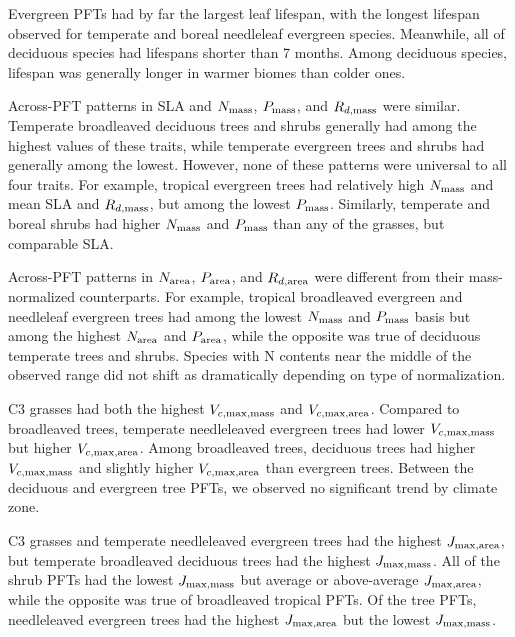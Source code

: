 Evergreen PFTs had by far the largest leaf lifespan, with the longest lifespan observed for temperate and boreal needleleaf evergreen species.
Meanwhile, all of deciduous species had lifespans shorter than 7 months.
Among deciduous species, lifespan was generally longer in warmer biomes than colder ones.

Across-PFT patterns in SLA and $N_{\text{mass}}$, $P_{\text{mass}}$, and $R_{d,\text{mass}}$ were similar.
Temperate broadleaved deciduous trees and shrubs generally had among the highest values of these traits, while temperate evergreen trees and shrubs had generally among the lowest.
However, none of these patterns were universal to all four traits.
For example, tropical evergreen trees had relatively high $N_{\text{mass}}$ and mean SLA and $R_{d,\text{mass}}$, but among the lowest $P_{\text{mass}}$.
Similarly, temperate and boreal shrubs had higher $N_{\text{mass}}$ and $P_{\text{mass}}$ than any of the grasses, but comparable SLA\@.

Across-PFT patterns in $N_{\text{area}}$, $P_{\text{area}}$, and $R_{d,\text{area}}$ were different from their mass-normalized counterparts.
For example, tropical broadleaved evergreen and needleleaf evergreen trees had among the lowest $N_{\text{mass}}$ and $P_{\text{mass}}$ basis but among the highest $N_{\text{area}}$ and $P_{\text{area}}$, while the opposite was true of deciduous temperate trees and shrubs.
Species with N contents near the middle of the observed range did not shift as dramatically depending on type of normalization.

C3 grasses had both the highest $V_{c,\max,\text{mass}}$ and $V_{c,\max,\text{area}}$.
Compared to broadleaved trees, temperate needleleaved evergreen trees had lower $V_{c,\max,\text{mass}}$ but higher $V_{c,\max,\text{area}}$.
Among broadleaved trees, deciduous trees had higher $V_{c,\max,\text{mass}}$ and slightly higher $V_{c,\max,\text{area}}$ than evergreen trees.
Between the deciduous and evergreen tree PFTs, we observed no significant trend by climate zone.

C3 grasses and temperate needleleaved evergreen trees had the highest $J_{\max,\text{area}}$, but temperate broadleaved deciduous trees had the highest $J_{\max,\text{mass}}$.
All of the shrub PFTs had the lowest $J_{\max,\text{mass}}$ but average or above-average $J_{\max,\text{area}}$, while the opposite was true of broadleaved tropical PFTs.
Of the tree PFTs, needleleaved evergreen trees had the highest $J_{\max,\text{area}}$ but the lowest $J_{\max,\text{mass}}$.

